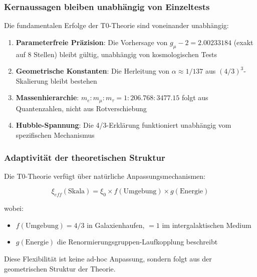 \documentclass[12pt,a4paper]{article}
\theoremstyle{definition}
\begin{document}
\subsubsection{Kernaussagen bleiben unabhängig von Einzeltests}

Die fundamentalen Erfolge der T0-Theorie sind voneinander unabhängig:

\begin{enumerate}
	\item \textbf{Parameterfreie Präzision}: Die Vorhersage von \(g_\mu - 2 = 2.00233184\) (exakt auf 8 Stellen) bleibt gültig, unabhängig von kosmologischen Tests
	
	\item \textbf{Geometrische Konstanten}: Die Herleitung von \(\alpha \approx 1/137\) aus \((4/3)^3\)-Skalierung bleibt bestehen
	
	\item \textbf{Massenhierarchie}: \(m_e : m_\mu : m_\tau = 1 : 206.768 : 3477.15\) folgt aus Quantenzahlen, nicht aus Rotverschiebung
	
	\item \textbf{Hubble-Spannung}: Die 4/3-Erklärung funktioniert unabhängig vom spezifischen Mechanismus
\end{enumerate}

\subsubsection{Adaptivität der theoretischen Struktur}

Die T0-Theorie verfügt über natürliche Anpassungsmechanismen:

\begin{equation}
	\xi_{eff}(\text{Skala}) = \xi_0 \times f(\text{Umgebung}) \times g(\text{Energie})
\end{equation}

wobei:
\begin{itemize}
	\item \(f(\text{Umgebung}) = 4/3\) in Galaxienhaufen, \(= 1\) im intergalaktischen Medium
	\item \(g(\text{Energie})\) die Renormierungsgruppen-Laufkopplung beschreibt
\end{itemize}

Diese Flexibilität ist keine ad-hoc Anpassung, sondern folgt aus der geometrischen Struktur der Theorie.
\end{document}
